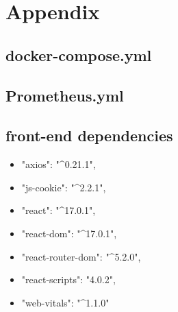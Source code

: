 \section{Appendix}

\subsection{docker-compose.yml}\label{appendix:docker-compose}


\newpage

\subsection{Prometheus.yml}\label{appendix:prometheus-config}


\subsection{front-end dependencies}\label{appendix:front-end-dependencies}
\begin{itemize}
    \item "axios": "\^{}0.21.1",
    \item "js-cookie": "\^{}2.2.1",
    \item "react": "\^{}17.0.1",
    \item "react-dom": "\^{}17.0.1",
    \item "react-router-dom": "\^{}5.2.0",
    \item "react-scripts": "4.0.2",
    \item "web-vitals": "\^{}1.1.0"
\end{itemize}

